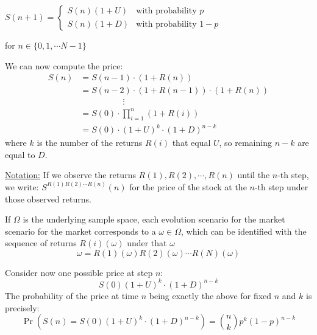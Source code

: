 \documentclass[oneside]{book}
\begin{document}
$S(n+1)=
\begin{cases}
S(n)(1+U) & \text{with probability } p\\
S(n)(1+D)  & \text{with probability } 1-p
\end{cases}$

for $n \in \{0, 1, \cdots N-1 \}$

We can now compute the price:
\begin{align*}
    S(n) &= S(n-1) \cdot (1 + R(n)) \\
        &= S(n-2) \cdot(1 + R(n-1)) \cdot (1 + R(n)) \\
        &\hspace{5em}\vdots\\
        &= S(0) \cdot \prod_{i=1}^n(1+R(i)) \\
        &= S(0) \cdot (1 + U)^k \cdot (1 + D)^{n-k}
\end{align*}
where $k$ is the number of the returns $R(i)$ that equal $U$, so
remaining $n-k$ are equal to $D$.

\underline{Notation:} If we observe the returns $R(1), R(2), \cdots, R(n)$ until
the $n$-th step, we write:
$S^{R(1)R(2) \cdots R(n)}(n)$ for the price of the stock at the $n$-th step under
those observed returns. \\

If $\Omega$ is the underlying sample space, each evolution scenario for the market
scenario for the market corresponds to a $\omega \in \Omega$, which can be identified
with the sequence of returns $R(i)(\omega)$ under that $\omega$
$$
\omega = R(1)(\omega)R(2)(\omega) \cdots R(N)(\omega)
$$

Consider now one possible price at step $n$:
$$
    S(0)(1+U)^k \cdot (1+D)^{n-k}
$$
The probability of the price at time $n$ being exactly the above for fixed
$n$ and $k$ is precisely:
$$
    \Pr(S(n) = S(0)(1+U)^k \cdot (1+D)^{n-k}) = \binom{n}{k}p^k(1-p)^{n-k}
$$
\end{document}
